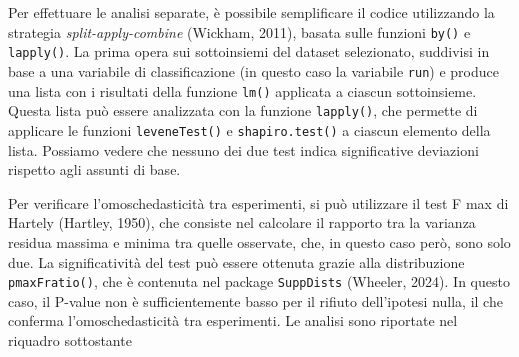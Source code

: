\documentclass[
  12pt,
]{book}
\begin{document}
Per effettuare le analisi separate, è possibile semplificare il codice utilizzando la strategia \emph{split-apply-combine} (Wickham, 2011), basata sulle funzioni \texttt{by()} e \texttt{lapply()}. La prima opera sui sottoinsiemi del dataset selezionato, suddivisi in base a una variabile di classificazione (in questo caso la variabile \texttt{run}) e produce una lista con i risultati della funzione \texttt{lm()} applicata a ciascun sottoinsieme. Questa lista può essere analizzata con la funzione \texttt{lapply()}, che permette di applicare le funzioni \texttt{leveneTest()} e \texttt{shapiro.test()} a ciascun elemento della lista. Possiamo vedere che nessuno dei due test indica significative deviazioni rispetto agli assunti di base.

Per verificare l'omoschedasticità tra esperimenti, si può utilizzare il test F max di Hartely (Hartley, 1950), che consiste nel calcolare il rapporto tra la varianza residua massima e minima tra quelle osservate, che, in questo caso però, sono solo due. La significatività del test può essere ottenuta grazie alla distribuzione \texttt{pmaxFratio()}, che è contenuta nel package \texttt{SuppDists} (Wheeler, 2024). In questo caso, il P-value non è sufficientemente basso per il rifiuto dell'ipotesi nulla, il che conferma l'omoschedasticità tra esperimenti. Le analisi sono riportate nel riquadro sottostante
\end{document}
